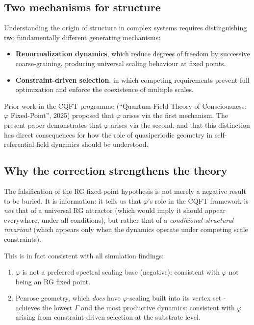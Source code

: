 \documentclass[11pt,a4paper]{article}
\theoremstyle{plain}
\theoremstyle{definition}
\newcommand{\phiGolden}{\varphi}
\begin{document}
\subsection{Two mechanisms for structure}

Understanding the origin of structure in complex systems requires
distinguishing two fundamentally different generating mechanisms:

\begin{itemize}[noitemsep]
  \item \textbf{Renormalization dynamics}, which reduce degrees of freedom
    by successive coarse-graining, producing universal scaling behaviour
    at fixed points.
  \item \textbf{Constraint-driven selection}, in which competing requirements
    prevent full optimization and enforce the coexistence of multiple scales.
\end{itemize}

Prior work in the CQFT programme
(``Quantum Field Theory of Consciousness: $\phiGolden$ Fixed-Point'', 2025)
proposed that $\phiGolden$ arises via the first mechanism. The present
paper demonstrates that $\phiGolden$ arises via the second, and that this
distinction has direct consequences for how the role of quasiperiodic
geometry in self-referential field dynamics should be understood.

\subsection{Why the correction strengthens the theory}

The falsification of the RG fixed-point hypothesis is not merely a negative
result to be buried. It is information: it tells us that $\phiGolden$'s
role in the CQFT framework is \emph{not} that of a universal RG attractor
(which would imply it should appear everywhere, under all conditions),
but rather that of a \emph{conditional structural invariant} (which appears
only when the dynamics operate under competing scale constraints).

This is in fact consistent with all simulation findings:
\begin{enumerate}[noitemsep]
  \item $\phiGolden$ is not a preferred spectral scaling base (negative):
    consistent with $\phiGolden$ not being an RG fixed point.
  \item Penrose geometry, which \emph{does} have $\phiGolden$-scaling
    built into its vertex set - achieves the lowest $\Gamma$ and the
    most productive dynamics: consistent with $\phiGolden$ arising
    from constraint-driven selection at the substrate level.
\end{enumerate}
\end{document}
